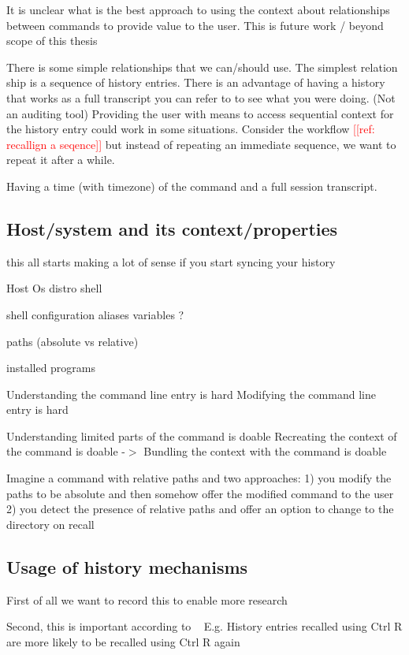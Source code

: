 \documentclass[thesis=M,english]{FITthesis}[2012/10/20]
\newcommand{\redtext}[1]{\textcolor{red}{[[#1]]}}
\let\myCite\cite
\renewcommand\cite{\unskip~\myCite}
\begin{document}
It is unclear what is the best approach to using the context about relationships between commands to provide value to the user.
This is future work / beyond scope of this thesis

There is some simple relationships that we can/should use.
The simplest relation ship is a sequence of history entries.
There is an advantage of having a history that works as a full transcript you can refer to to see what you were doing. (Not an auditing tool)
Providing the user with means to access sequential context for the history entry could work in some situations.
Consider the workflow \redtext{ref: recallign a seqence} but instead of repeating an immediate sequence, we want to repeat it after a while.

Having a time (with timezone) of the command and a full session transcript.

\subsection{Host/system and its context/properties}

this all starts making a lot of sense if you start syncing your history

Host
Os
distro
shell

shell configuration
aliases
variables ?

paths (absolute vs relative)

installed programs

Understanding the command line entry is hard
Modifying the command line entry is hard

Understanding limited parts of the command is doable
Recreating the context of the command is doable
-$>$ Bundling the context with the command is doable

Imagine a command with relative paths and two approaches: 1) you modify the paths to be absolute and then somehow offer the modified command to the user 2) you detect the presence of relative paths and offer an option to change to the directory on recall

\subsection{Usage of history mechanisms}

First of all we want to record this to enable more research

Second, this is important according to \cite{greenberg1993computer}
E.g. History entries recalled using Ctrl R are more likely to be recalled using Ctrl R again
\end{document}
